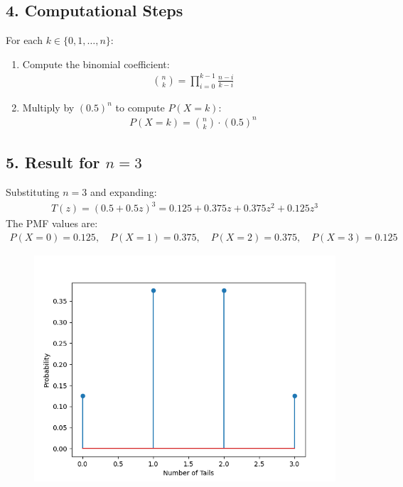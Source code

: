 \documentclass[journal]{IEEEtran}
\begin{document}
\subsection*{4. Computational Steps}
For each \(k \in \{0, 1, \dots, n\}\):
\begin{enumerate}
    \item Compute the binomial coefficient:
    \begin{align}
    \binom{n}{k} = \prod_{i=0}^{k-1} \frac{n-i}{k-i}
    \end{align}
    \item Multiply by \((0.5)^n\) to compute \(P(X = k)\):
    \begin{align}
    P(X = k) = \binom{n}{k} \cdot (0.5)^n
    \end{align}
\end{enumerate}

\subsection*{5. Result for \(n = 3\)}
Substituting \(n = 3\) and expanding:
\begin{align}
T(z) = (0.5 + 0.5z)^3 = 0.125 + 0.375z + 0.375z^2 + 0.125z^3
\end{align}
The PMF values are:
\begin{align}
P(X = 0) = 0.125, \quad P(X = 1) = 0.375, \quad P(X = 2) = 0.375, \quad P(X = 3) = 0.125
\end{align}


	\begin{figure}[h!]
		\centering
		\includegraphics[width=\columnwidth]{figs/fig1.png}
		\label{stemplot}
	\end{figure}
	
\end{document}
